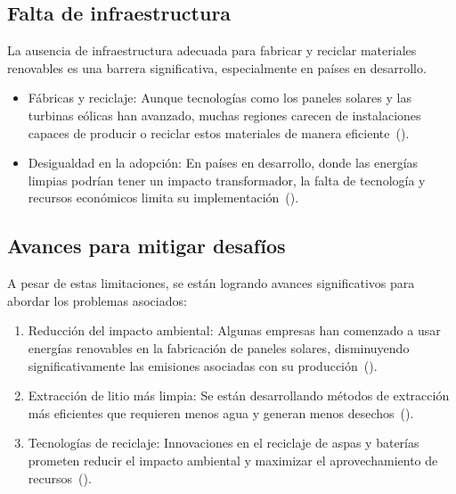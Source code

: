 \documentclass[letterpaper, 12pt]{article}
\begin{document}
\subsection{Falta de infraestructura}

La ausencia de infraestructura adecuada para fabricar y reciclar materiales
renovables es una barrera significativa, especialmente en países en desarrollo.

\begin{itemize}
      \item Fábricas y reciclaje: Aunque tecnologías como los paneles solares y las
            turbinas eólicas han avanzado, muchas regiones carecen de instalaciones capaces
            de producir o reciclar estos materiales de manera eficiente~(\cite{Abera2023}).

      \item Desigualdad en la adopción: En países en desarrollo, donde las energías limpias
            podrían tener un impacto transformador, la falta de tecnología y recursos
            económicos limita su implementación~(\cite{ColinLuna_deLeoWinkler_nd}).
\end{itemize}

\subsection*{Avances para mitigar desafíos }

A pesar de estas limitaciones, se están logrando avances significativos para
abordar los problemas asociados:

\begin{enumerate}
      \item Reducción del impacto ambiental: Algunas empresas han comenzado a usar energías
            renovables en la fabricación de paneles solares, disminuyendo
            significativamente las emisiones asociadas con su
            producción~(\cite{Kubik2020}).

      \item Extracción de litio más limpia: Se están desarrollando métodos de extracción
            más eficientes que requieren menos agua y generan menos
            desechos~(\cite{Leanez2022}).

      \item Tecnologías de reciclaje: Innovaciones en el reciclaje de aspas y baterías
            prometen reducir el impacto ambiental y maximizar el aprovechamiento de
            recursos~(\cite{Ebhota_Jen2019}).
\end{enumerate}
\end{document}
